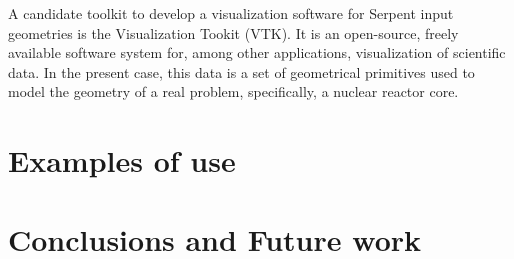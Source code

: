 \documentclass{elsarticle}
\begin{document}
A candidate toolkit to develop a visualization software for Serpent input 
geometries is the Visualization Tookit (VTK)\cite{vtk}. It is an open-source, 
freely available software system for, among other applications, visualization of 
scientific data. In the present case, this data is a set of geometrical 
primitives used to model the geometry of a real problem, specifically, a 
nuclear reactor core.

\section{Examples of use}

\section{Conclusions and Future work}



\end{document}
